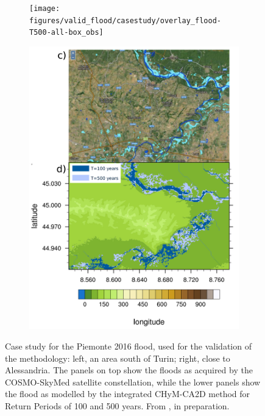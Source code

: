 \begin{figure}
    \centering
    \begin{subfigure}{7.3cm}
        \texttt{[image: figures/valid\_flood/casestudy/overlay\_flood-T500-all-box\_obs]}
    \end{subfigure}
    \begin{subfigure}{6cm}
        \includegraphics[width=\textwidth]{figures/valid_flood/casestudy/overlay_flood-T500-alessandria}
    \end{subfigure}
    \decoRule
    \caption[Case study: Piemonte 2016 flood]{
        Case study for the Piemonte 2016 flood, used for the validation of the methodology: left, an area south of Turin; right, close to Alessandria.
        The panels on top show the floods as acquired by the COSMO-SkyMed satellite constellation, while the lower panels show the flood as modelled by the integrated CHyM-CA2D method for Return Periods of 100 and 500 years. From \citet{nogherotto2019}, in preparation.
    }\label{fig:valid_casestudy}
\end{figure}

